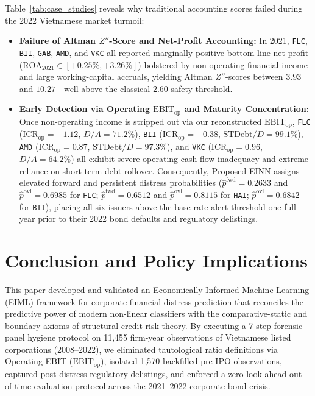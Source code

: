 \documentclass[pdflatex,sn-mathphys-num,twocolumn]{sn-jnl}
\theoremstyle{thmstyleone}
\theoremstyle{thmstyletwo}
\theoremstyle{thmstylethree}
\begin{document}
Table~\ref{tab:case_studies} reveals why traditional accounting scores failed during the 2022 Vietnamese market turmoil:
\begin{itemize}
    \item \textbf{Failure of Altman $Z''$-Score and Net-Profit Accounting:} In 2021, \texttt{FLC}, \texttt{BII}, \texttt{GAB}, \texttt{AMD}, and \texttt{VKC} all reported marginally positive bottom-line net profit ($\text{ROA}_{2021} \in [+0.25\%, +3.26\%]$) bolstered by non-operating financial income and large working-capital accruals, yielding Altman $Z''$-scores between $3.93$ and $10.27$---well above the classical $2.60$ safety threshold.
    \item \textbf{Early Detection via Operating $\text{EBIT}_{\text{op}}$ and Maturity Concentration:} Once non-operating income is stripped out via our reconstructed $\text{EBIT}_{\text{op}}$, \texttt{FLC} ($\text{ICR}_{\text{op}} = -1.12$, $D/A = 71.2\%$), \texttt{BII} ($\text{ICR}_{\text{op}} = -0.38$, $\text{STDebt}/D = 99.1\%$), \texttt{AMD} ($\text{ICR}_{\text{op}} = 0.87$, $\text{STDebt}/D = 97.3\%$), and \texttt{VKC} ($\text{ICR}_{\text{op}} = 0.96$, $D/A = 64.2\%$) all exhibit severe operating cash-flow inadequacy and extreme reliance on short-term debt rollover. Consequently, Proposed EINN assigns elevated forward and persistent distress probabilities ($\hat{p}^{\text{fwd}} = 0.2633$ and $\hat{p}^{\text{ovl}} = 0.6985$ for \texttt{FLC}; $\hat{p}^{\text{fwd}} = 0.6512$ and $\hat{p}^{\text{ovl}} = 0.8115$ for \texttt{HAI}; $\hat{p}^{\text{ovl}} = 0.6842$ for \texttt{BII}), placing all six issuers above the base-rate alert threshold one full year prior to their 2022 bond defaults and regulatory delistings.
\end{itemize}

\section{Conclusion and Policy Implications}
\label{sec:conclusion}

This paper developed and validated an Economically-Informed Machine Learning (EIML) framework for corporate financial distress prediction that reconciles the predictive power of modern non-linear classifiers with the comparative-static and boundary axioms of structural credit risk theory. By executing a 7-step forensic panel hygiene protocol on 11,455 firm-year observations of Vietnamese listed corporations (2008--2022), we eliminated tautological ratio definitions via Operating EBIT ($\text{EBIT}_{\text{op}}$), isolated 1,570 backfilled pre-IPO observations, captured post-distress regulatory delistings, and enforced a zero-look-ahead out-of-time evaluation protocol across the 2021--2022 corporate bond crisis.
\end{document}
